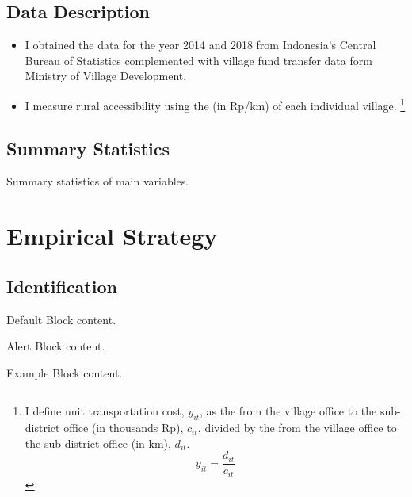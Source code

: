 \documentclass[
10pt,notheorems,compress,hyperref={pdfauthor=Maghfira Ramadhani}
]{beamer}
\begin{document}
\subsection{Data Description}
\begin{frame}
    \begin{itemize}
        \item I obtained the  data for the year 2014 and 2018 from Indonesia's Central Bureau of Statistics complemented with village fund transfer data form Ministry of Village Development.
        \item I measure rural accessibility using the  (in Rp/km) of each individual village. 
        \footnote{I define unit transportation cost, $y_{it}$, as the  from the village office to the sub-district office (in thousands Rp), $c_{it}$, divided by the  from the village office to the sub-district office (in km), $d_{it}$.
        \begin{equation}
        y_{it}=\frac{d_{it}}{c_{it}}    
        \end{equation}}
    \end{itemize}
\end{frame}

\subsection{Summary Statistics}
\begin{frame}
    \begin{table}[h]
    \caption{Summary statistics of main variables. }
    \scalebox{0.75}{}
    \label{t1}\end{table}
\end{frame}

\section{Empirical Strategy}
\subsection{Identification}
\begin{frame}

   \centering
	\begin{minipage}[b]{0.5\textwidth}

	  \begin{block}{Default}
        Block content.
      \end{block}

      \begin{alertblock}{Alert}
        Block content.
      \end{alertblock}

      \begin{exampleblock}{Example}
        Block content.
      \end{exampleblock}      
      
	\end{minipage}	
\end{frame}
\end{document}
